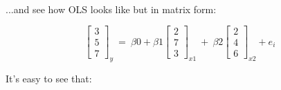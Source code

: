 \documentclass[10pt]{article}
\begin{document}
\paragraph{}...and see how OLS looks like but in matrix form:


\begin{equation*}
\begin{bmatrix}
3\\
5\\
7
\end{bmatrix}_{y} \ =\ \beta 0+\beta 1\begin{bmatrix}
2\\
7\\
3
\end{bmatrix}_{x1} \ +\ \beta 2\begin{bmatrix}
2\\
4\\
6
\end{bmatrix}_{x2} +e_{i}
\end{equation*}

It's easy to see that:
\end{document}
